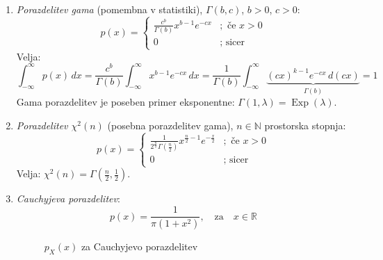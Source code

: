 \documentclass[12pt]{book}
\theoremstyle{definition}
\theoremstyle{plain}
\theoremstyle{plain}
\theoremstyle{plain}
\theoremstyle{remark}
\begin{document}
\begin{enumerate}
    \item \emph{Porazdelitev gama} (pomembna v statistiki), $\Gamma(b,c)$, $b>0$, $c>0$:
    $$
    p(x)= \begin{cases}\frac{c^b}{\Gamma(b)} x^{b-1} e^{-c x} &; \text { če } x>0 \\ 0 &; \text { sicer }\end{cases}
    $$
    Velja: 
    $$
    \int_{-\infty}^{\infty} p(x) \, d x=\frac{c^b}{\Gamma(b)} \int_{-\infty}^{\infty} x^{b-1} e^{-c x} \, d x=\frac{1}{\Gamma(b)} \int_{-\infty}^{\infty} \underbrace{(c x)^{k-1} e^{-c x} \, d(c x)}_{\Gamma(b)}=1
    $$
    Gama porazdelitev je poseben primer eksponentne: $\Gamma(1,\lambda) = \operatorname{Exp}(\lambda)$.

    \item \emph{Porazdelitev $\chi^2(n)$} (posebna porazdelitev gama), $n \in \mathbb{N}$ prostorska stopnja:
    $$
    p(x)=\begin{cases}
        \frac{1}{2^{\frac{n}{2}} \Gamma\left(\frac{n}{2}\right)} x^{\frac{n}{2}-1} e^{-\frac{x}{2}} &; \text { če } x>0 \\
        0 &; \text { sicer }
        \end{cases}
    $$
    Velja: $\chi^2(n)=\Gamma\left(\frac{n}{2}, \frac{1}{2}\right)$.
    \item \emph{Cauchyjeva porazdelitev}:
    $$
    p(x)=\frac{1}{\pi \left(1+x^2\right)}, \quad \text{za} \quad x \in \mathbb{R}
    $$
    \begin{figure}[H]
        \centering

        \caption{$p_X(x)$ za Cauchyjevo porazdelitev}
        \label{fig:18}
    \end{figure}


\end{enumerate}
\end{document}
